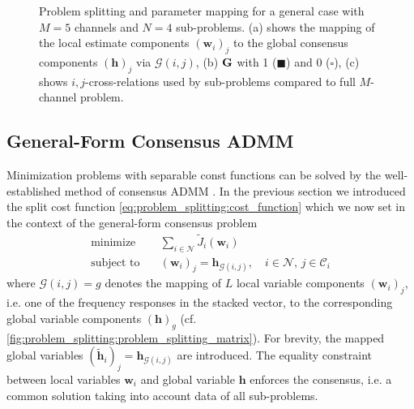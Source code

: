 \documentclass{article}
\newcommand{\hf}{{\bm{h}}}
\newcommand{\wf}{{\bm{w}}}
\newcommand{\Cset}{\mathcal{C}}
\newcommand{\Nset}{\mathcal{N}}
\begin{document}
\begin{figure}
    \centering
    \subfloat[][]{}
    \subfloat[][]{}
    \vspace*{-0.3cm}
    \caption{Problem splitting and parameter mapping for a general case with \(M=5\) channels and \(N=4\) sub-problems. (a) shows the mapping of the local estimate components \((\wf_i)_j\) to the global consensus components \((\hf)_j\) via \(\mathcal{G}(i,j)\), (b) \(\bm{\mathrm{G}}\) with 1 (\(\blacksquare\)) and 0 (\(\square\)), (c) shows \(i,j\)-cross-relations used by sub-problems compared to full \(M\)-channel problem.}
    \label{fig:problem_splitting:problem_splitting_matrix}
\end{figure}

\subsection{General-Form Consensus ADMM}
\label{ssec:general_consensus_admm}
Minimization problems with separable const functions can be solved by the well-established method of consensus ADMM \cite{boydDistributedOptimizationStatistical2011}.
In the previous section we introduced the split cost function \eqref{eq:problem_splitting:cost_function} which we now set in the context of the general-form consensus problem
\begin{align}
    \operatorname{minimize} \quad &\sum_{i \in \Nset} \tilde{J}_i(\wf_i)\\
    \text{subject to} \quad &(\wf_i)_j = \hf_{\mathcal{G}(i,j)},\quad i \in \Nset,\,j \in \Cset_i
\end{align}
where \(\mathcal{G}(i,j)=g\) denotes the mapping of \(L\) local variable components \((\wf_i)_j\), i.e. one of the frequency responses in the stacked vector, to the corresponding global variable components \((\hf)_g\) (cf. \autoref{fig:problem_splitting:problem_splitting_matrix}).
For brevity, the mapped global variables \((\tilde{\hf}_i)_j = \hf_{\mathcal{G}(i,j)}\) are introduced.
The equality constraint between local variables \(\wf_i\) and global variable \(\hf\) enforces the consensus, i.e. a common solution taking into account data of all sub-problems.
\end{document}
